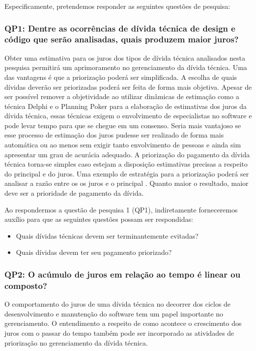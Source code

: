 Especificamente, pretendemos responder as seguintes questões de pesquisa:

\subsubsection{QP1: Dentre as ocorrências de dívida técnica de design e código que serão analisadas, quais produzem maior juros?}

Obter uma estimativa para os juros dos tipos de dívida técnica analisados nesta pesquisa permitirá um aprimoramento no gerenciamento da dívida técnica. Uma das vantagens é que a priorização poderá ser simplificada.  A escolha de quais dívidas deverão ser priorizadas poderá ser feita de forma mais objetiva. Apesar de ser possível remover a objetividade ao utilizar dinâmicas de estimação como a técnica Delphi\cite{hsu2007delphi} e o Planning Poker\cite{haugen2006empirical} para a elaboração de estimativas dos juros da dívida técnica, essas técnicas exigem o envolvimento de especialistas no software e pode levar tempo para que se chegue em um consenso. Seria mais vantajoso se esse processo de estimação dos juros pudesse ser realizado de forma mais automática ou ao menos sem exigir tanto envolvimento de pessoas e ainda sim apresentar um grau de acurácia adequado. A priorização do pagamento da dívida técnica torna-se simples caso estejam a disposição estimativas precisas a respeito do principal e do juros. Uma exemplo de estratégia para a priorização poderá ser analisar a razão entre os os juros e o principal . Quanto maior o resultado, maior deve ser a prioridade de pagamento da dívida. 

Ao respondermos a questão de pesquisa 1 (QP1), indiretamente forneceremos auxílio para que as seguintes questões possam ser respondidas: 

\begin{itemize}
\item Quais dívidas técnicas devem ser terminantemente evitadas?
\item Quais dívidas devem ter seu pagamento priorizado?


\end{itemize}

\subsubsection{QP2: O acúmulo de juros em relação ao tempo é linear ou composto?}

O comportamento do juros de uma dívida técnica no decorrer dos ciclos de desenvolvimento e manutenção do software tem um papel importante no gerenciamento. O entendimento a respeito de como acontece o crescimento dos juros com o passar do tempo também pode ser incorporado as atividades de priorização no gerenciamento da dívida técnica.

